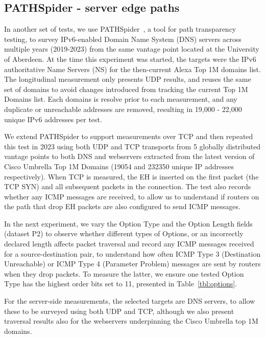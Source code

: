 \documentclass[conference]{IEEEtran}
\begin{document}
    \subsection{PATHSpider - server edge paths}
    \label{sec:pathspider-methodology}

In another set of tests, we use PATHSpider~\cite{learmonth2016pathspider}, a tool for path transparency testing, to survey IPv6-enabled Domain Name System (DNS) servers across multiple years (2019-2023) from the same vantage point located at the University of Aberdeen. At the time this experiment was started, the targets were the IPv6 authoritative Name Servers (NS) for the then-current Alexa Top 1M domains list. The longitudinal measurement only presents UDP results, and reuses the same set of domains to avoid changes introduced from tracking the current Top 1M Domains list. Each domains is resolve prior to each measurement, and any duplicate or unreachable addresses are removed, resulting in 19,000 - 22,000 unique IPv6 addresses per test.

We extend PATHSpider to support measurements over TCP and then repeated this test in 2023 using both UDP and TCP transports from 5 globally distributed vantage points to both DNS and webservers extracted from the latest version of Cisco Umbrella Top 1M Domains (19054 and 232350 unique IP addresses respectively). When TCP is measured, the EH is inserted on the first packet (the TCP SYN) and all subsequent packets in the connection.
The test also records whether any ICMP messages are received, to allow us to understand if routers on the path that drop EH packets are also configured to send ICMP messages.

In the next experiment, we vary the Option Type and the Option Length fields (dataset P2) to observe whether different types of Options, or an incorrectly declared length affects packet traversal and record any ICMP messages received
for a source-destination pair, to understand how often ICMP Type 3 (Destination Unreachable) or ICMP Type 4 (Parameter Problem) messages are sent by routers when they drop packets. To measure the latter, we ensure one tested Option Type has the highest order bits set to 11, presented in Table~\ref{tbl:options}.

For the server-side measurements, the selected targets are DNS servers, to allow these to be surveyed using both UDP and TCP, although we also present traversal results also for the webservers underpinning the Cisco Umbrella top 1M domains.
\end{document}
